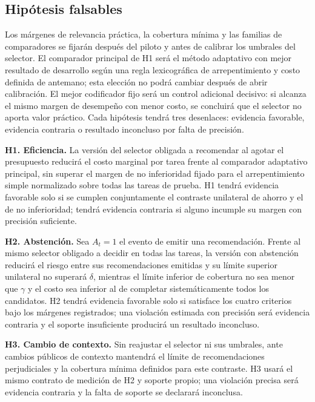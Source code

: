 \documentclass[11pt,letterpaper]{article}
\begin{document}
\subsection{Hipótesis falsables}

Los márgenes de relevancia práctica, la cobertura mínima y las familias de comparadores se fijarán después del piloto y antes de calibrar los umbrales del selector.
El comparador principal de H1 será el método adaptativo con mejor resultado de desarrollo según una regla lexicográfica de arrepentimiento y costo definida de antemano; esta elección no podrá cambiar después de abrir calibración.
El mejor codificador fijo será un control adicional decisivo: si alcanza el mismo margen de desempeño con menor costo, se concluirá que el selector no aporta valor práctico.
Cada hipótesis tendrá tres desenlaces: evidencia favorable, evidencia contraria o resultado inconcluso por falta de precisión.

\noindent\textbf{H1. Eficiencia.}
La versión del selector obligada a recomendar al agotar el presupuesto reducirá el costo marginal por tarea frente al comparador adaptativo principal, sin superar el margen de no inferioridad fijado para el arrepentimiento simple normalizado sobre todas las tareas de prueba.
H1 tendrá evidencia favorable solo si se cumplen conjuntamente el contraste unilateral de ahorro y el de no inferioridad; tendrá evidencia contraria si alguno incumple su margen con precisión suficiente.

\noindent\textbf{H2. Abstención.}
Sea $A_t=1$ el evento de emitir una recomendación.
Frente al mismo selector obligado a decidir en todas las tareas, la versión con abstención reducirá el riesgo entre sus recomendaciones emitidas y su límite superior unilateral no superará $\delta$, mientras el límite inferior de cobertura no sea menor que $\gamma$ y el costo sea inferior al de completar sistemáticamente todos los candidatos.
H2 tendrá evidencia favorable solo si satisface los cuatro criterios bajo los márgenes registrados; una violación estimada con precisión será evidencia contraria y el soporte insuficiente producirá un resultado inconcluso.

\noindent\textbf{H3. Cambio de contexto.}
Sin reajustar el selector ni sus umbrales, ante cambios públicos de contexto mantendrá el límite de recomendaciones perjudiciales y la cobertura mínima definidos para este contraste.
H3 usará el mismo contrato de medición de H2 y soporte propio; una violación precisa será evidencia contraria y la falta de soporte se declarará inconclusa.
\end{document}
